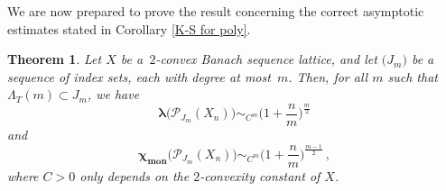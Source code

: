 \documentclass[12pt]{amsart}
\numberwithin{subsection}{section}
\newtheorem{theorem}{Theorem}[section]
\theoremstyle{definition}
\theoremstyle{remark}
\DeclareMathOperator{\mon}{mon}
\newcommand{\chimon}{\chi_{\mon}}
\begin{document}
We are now prepared to prove the result concerning the correct asymptotic estimates stated in Corollary
\ref{K-S for poly}.

\begin{theorem}\label{lower bound 2-convex for poly}
Let  $X$ be a \,$2$-convex Banach sequence lattice, and let $\big(J_m\big)$ be a sequence of index sets,
each with degree at most~$m$. Then, for all $m$ such that $\Lambda_T(m) \subset J_m$, we have
\begin{equation} \label{mmm 2-conv}
\boldsymbol{\lambda}\big(\mathcal{P}_{J_m}(X_n)\big)  \sim_{C^m}\Big( 1+\frac{n}{m}\Big)^{\frac{m}{2}}
\end{equation}
and
\begin{equation} \label{MMM 2-conv}
\boldsymbol{\chimon}\big(\mathcal{P}_{J_m}(X_n)\big)  \sim_{C^m}\Big(1+ \frac{n}{m}\Big)^{\frac{m-1}{2}}\,,
\end{equation}
where $C > 0$ only depends on the $2$-convexity constant of $X$.
\end{theorem}
\end{document}
